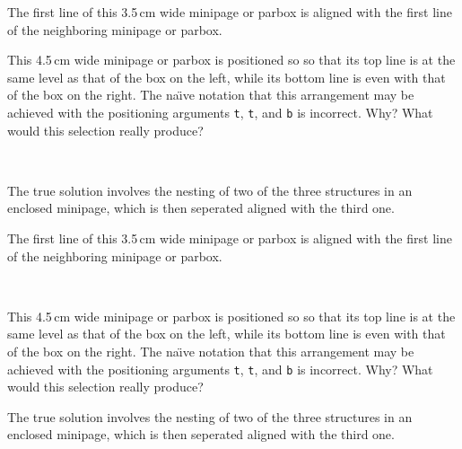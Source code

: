 \documentclass{article}
\begin{document}
\footnotesize\noindent
\begin{minipage}[b]{85mm}
\parbox[t]{3.5cm}{The first line of this 3.5\,cm wide minipage or parbox
   is aligned with the first line of the neighboring minipage or parbox.}
\hfill
\parbox[t]{4.5cm}{This 4.5\,cm wide minipage or parbox is positioned so
   so that its top line is at the same level as that of the box on the
   left, while its bottom line is even with that of the box on the right.
   The na\"{\i}ve notation that this arrangement may be achieved with the
   positioning arguments \texttt{t}, \texttt{t}, and \texttt{b} is incorrect.
   Why? What would this selection really produce?} \\ \mbox{}
\end{minipage}\hfill
\parbox[b]{3.1cm}{The true solution involves the nesting of two of the three
   structures in an enclosed minipage, which is then seperated aligned
   with the third one.} 

\vspace{10mm}\noindent
\parbox[t]{3.5cm}{The first line of this 3.5\,cm wide minipage or parbox
   is aligned with the first line of the neighboring minipage or parbox.}
\hfill
\begin{minipage}[t]{81mm}\mbox{}\\
\parbox[b]{4.5cm}{This 4.5\,cm wide minipage or parbox is positioned so
   so that its top line is at the same level as that of the box on the
   left, while its bottom line is even with that of the box on the right.
   The na\"{\i}ve notation that this arrangement may be achieved with the
   positioning arguments \texttt{t}, \texttt{t}, and \texttt{b} is incorrect.
   Why? What would this selection really produce?}  
\hfill
\parbox[b]{3.1cm}{The true solution involves the nesting of two of the three
   structures in an enclosed minipage, which is then seperated aligned
   with the third one.} 
\end{minipage}
\end{document}
